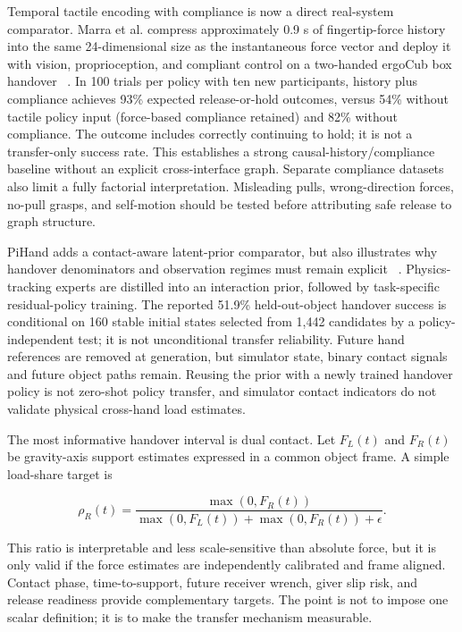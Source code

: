 Temporal tactile encoding with compliance is now a direct real-system comparator.
Marra et al. compress approximately 0.9 s of fingertip-force history into the same
24-dimensional size as the instantaneous force vector and deploy it with vision,
proprioception, and compliant control on a two-handed ergoCub box handover
~\cite{marra2026temporaltactilehandover}. In 100 trials per policy with ten new
participants, history plus compliance achieves 93\% expected release-or-hold
outcomes, versus 54\% without tactile policy input (force-based compliance
retained) and 82\% without compliance. The outcome
includes correctly continuing to hold; it is not a transfer-only success rate.
This establishes a strong causal-history/compliance baseline without an explicit
cross-interface graph. Separate compliance datasets also limit a fully factorial
interpretation. Misleading pulls, wrong-direction forces, no-pull grasps, and
self-motion should be tested before attributing safe release to graph structure.

PiHand adds a contact-aware latent-prior comparator, but also illustrates why
handover denominators and observation regimes must remain explicit
~\cite{update2026pihand}. Physics-tracking experts are distilled into an
interaction prior, followed by task-specific residual-policy training. The
reported 51.9\% held-out-object handover success is conditional on 160 stable
initial states selected from 1,442 candidates by a policy-independent test; it is
not unconditional transfer reliability. Future hand references are removed at
generation, but simulator state, binary contact signals and future object paths
remain. Reusing the prior with a newly trained handover policy is not zero-shot
policy transfer, and simulator contact indicators do not validate physical
cross-hand load estimates.

The most informative handover interval is dual contact. Let $F_L(t)$ and $F_R(t)$
be gravity-axis support estimates expressed in a common object frame. A simple
load-share target is

\begin{equation}
\rho_R(t)=\frac{\max(0,F_R(t))}
{\max(0,F_L(t))+\max(0,F_R(t))+\epsilon}.
\label{eq:loadshare}
\end{equation}

This ratio is interpretable and less scale-sensitive than absolute force, but it
is only valid if the force estimates are independently calibrated and frame
aligned. Contact phase, time-to-support, future receiver wrench, giver slip risk,
and release readiness provide complementary targets. The point is not to impose
one scalar definition; it is to make the transfer mechanism measurable.

